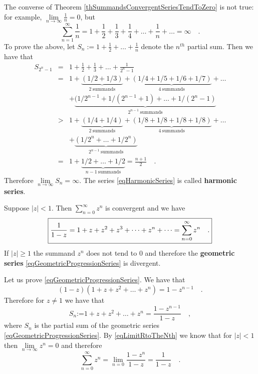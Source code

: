 \documentclass[12pt]{book}
\newcommand{\eqdef}{\textbf{:=}}
\renewcommand{\emph}{\textbf}
\begin{document}
The converse of Theorem \ref{thSummandsConvergentSeriesTendToZero} is not true: for example, $\lim\limits_{n\to \infty} \frac{1}{n}=0$, but
\begin{equation}\label{eqHarmonicSeries}
\sum_{n=1}^{\infty}\frac{1}n= 1+\frac{1}2+\frac13+\frac14+\dots +\frac1n+\dots=\infty\quad .
\end{equation}
To prove the above, let $S_n:=1+\frac{1}2+\dots +\frac{1}n$ denote the $n^{th}$ partial sum. Then we have that
\begin{equation*}
\begin{array}{rcl}
S_{2^n-1}&=&1+\frac{1}2+\frac13 +\dots +\frac{1}{2^n-1}\\
&=& 1+ \underbrace{\left(1/2+ 1/3\right)}_{\mathrm{2~summands}} +\underbrace{(1/4 +1/5+1/6+1/7)}_{\mathrm{4~summands}}+\dots \\
&&+ \underbrace{(1/2^{n-1}+1/(2^{n-1}+1)+\dots +1/(2^{n}-1)}_{2^{n-1}\mathrm{~summands}}\\
&>& 1+ \underbrace{\left(1/4+1/4\right)}_{\mathrm{2~summands}} +\underbrace{(1/8+1/8+1/8+1/8)}_{\mathrm{4~summands}}+\dots \\
&& + \underbrace{(1/2^{n}+\dots +1/2^{n})}_{2^{n-1}\mathrm{~summands}}\\
&=&1+\underbrace{  1/2+\dots +1/2}_{n-1\mathrm{~summands}}= \frac{n+1}2\quad .
\end{array}
\end{equation*}
Therefore $\lim\limits_{n\to \infty} S_{n}=\infty $. The series \eqref{eqHarmonicSeries} is called \emph{harmonic series}.

Suppose $|z|<1$. Then $\sum_{n=0}^{\infty} z^n$ is convergent and we have
\begin{equation}\boxed{
\label{eqGeometricProgressionSeries}
\frac{1}{1-z}=1+z+z^2+z^3+\dots +z^n+\dots= \sum_{n=0}^{\infty} z^n\quad.
}
\end{equation}
If $|z|\geq 1$ the summand $z^n$ does not tend to $0$ and therefore the \emph{geometric series} \eqref{eqGeometricProgressionSeries} is divergent. 

Let us prove \eqref{eqGeometricProgressionSeries}. We have that
\[(1-z)(1+z+z^2+\dots +z^{n})= 1- z^{n-1}\quad .
\]
Therefore for $z\neq 1$ we have that
\[
S_n\eqdef 1+z+z^2+\dots +z^n=\frac{1-z^{n-1}}{1-z}\quad ,
\]
where $S_n$ is the partial sum of the geometric series \eqref{eqGeometricProgressionSeries}. By \eqref{eqLimitRtoTheNth} we know that for $|z|<1$ then $\lim\limits_{n\to \infty} z^n=0$ and therefore
\[
\sum_{n=0}^{\infty}z^n=\lim\limits_{n=0} \frac{1-z^n}{1-z}= \frac{1}{1-z} \quad.
\]
\end{document}

